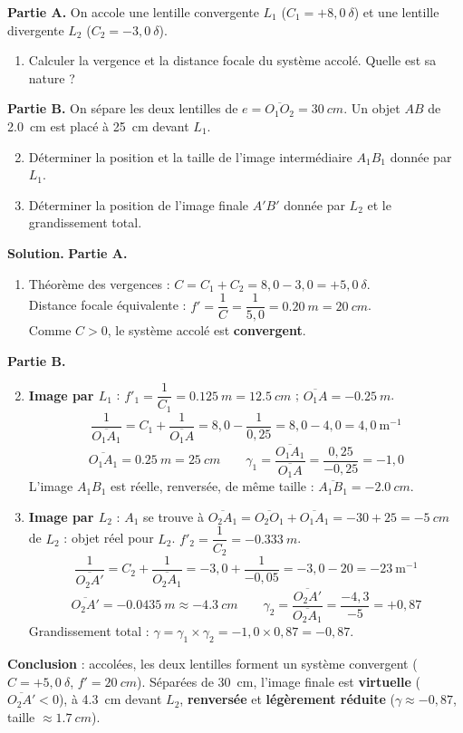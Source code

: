 \documentclass[11pt]{article}
\begin{document}
\begin{exoresolu}
\textbf{Partie A.} On accole une lentille convergente $L_1$ ($C_1 = +8,0\ \delta$) et une lentille divergente $L_2$ ($C_2 = -3,0\ \delta$).
\begin{enumerate}
\item Calculer la vergence et la distance focale du système accolé. Quelle est sa nature ?
\end{enumerate}
\textbf{Partie B.} On sépare les deux lentilles de $e = \overline{O_1O_2} = \SI{30}{cm}$. Un objet $AB$ de \SI{2,0}{cm} est placé à \SI{25}{cm} devant $L_1$.
\begin{enumerate}
\setcounter{enumi}{1}
\item Déterminer la position et la taille de l'image intermédiaire $A_1B_1$ donnée par $L_1$.
\item Déterminer la position de l'image finale $A'B'$ donnée par $L_2$ et le grandissement total.
\end{enumerate}
\tcblower
\textbf{Solution.}
\textbf{Partie A.}
\begin{enumerate}
\item Théorème des vergences : $C = C_1 + C_2 = 8,0 - 3,0 = +5,0\ \delta$. \\
Distance focale équivalente : $f' = \dfrac{1}{C} = \dfrac{1}{5,0} = \SI{0,20}{m} = \SI{20}{cm}$. \\
Comme $C > 0$, le système accolé est \textbf{convergent}.
\end{enumerate}
\textbf{Partie B.}
\begin{enumerate}
\setcounter{enumi}{1}
\item \textbf{Image par $L_1$} : $f'_1 = \dfrac{1}{C_1} = \SI{0,125}{m} = \SI{12,5}{cm}$ ; $\overline{O_1A} = \SI{-0,25}{m}$.
\[ \frac{1}{\overline{O_1A_1}} = C_1 + \frac{1}{\overline{O_1A}} = 8,0 - \frac{1}{0,25} = 8,0 - 4,0 = 4,0 \ \text{m}^{-1} \]
\[ \overline{O_1A_1} = \SI{0,25}{m} = \SI{25}{cm} \qquad \gamma_1 = \frac{\overline{O_1A_1}}{\overline{O_1A}} = \frac{0,25}{-0,25} = -1,0 \]
L'image $A_1B_1$ est réelle, renversée, de même taille : $\overline{A_1B_1} = \SI{-2,0}{cm}$.
\item \textbf{Image par $L_2$} : $A_1$ se trouve à $\overline{O_2A_1} = \overline{O_2O_1} + \overline{O_1A_1} = -30 + 25 = \SI{-5}{cm}$ de $L_2$ : objet réel pour $L_2$. $f'_2 = \dfrac{1}{C_2} = \SI{-0,333}{m}$.
\[ \frac{1}{\overline{O_2A'}} = C_2 + \frac{1}{\overline{O_2A_1}} = -3,0 + \frac{1}{-0,05} = -3,0 - 20 = -23 \ \text{m}^{-1} \]
\[ \overline{O_2A'} = \SI{-0,0435}{m} \approx \SI{-4,3}{cm} \qquad \gamma_2 = \frac{\overline{O_2A'}}{\overline{O_2A_1}} = \frac{-4,3}{-5} = +0,87 \]
Grandissement total : $\gamma = \gamma_1 \times \gamma_2 = -1,0 \times 0,87 = -0,87$.
\end{enumerate}
\textbf{Conclusion} : accolées, les deux lentilles forment un système convergent ($C=+5,0\ \delta$, $f'=\SI{20}{cm}$). Séparées de \SI{30}{cm}, l'image finale est \textbf{virtuelle} ($\overline{O_2A'} < 0$), à \SI{4,3}{cm} devant $L_2$, \textbf{renversée} et \textbf{légèrement réduite} ($\gamma \approx -0,87$, taille $\approx \SI{1,7}{cm}$).
\end{exoresolu}
\end{document}
